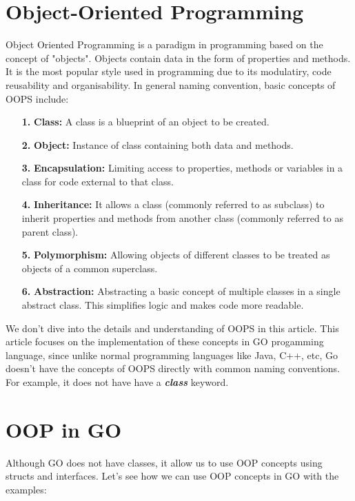 \documentclass[12pt,a4paper]{report}
\begin{document}
\section*{Object-Oriented Programming}
Object Oriented Programming is a paradigm in programming based on the concept of "objects". Objects contain data in the form of properties and methods.
It is the most popular style used in programming due to its modulatiry, code reusability and organisability.
In general naming convention, basic concepts of OOPS include:

\begin{enumerate}
    \item[\textbf{1.}]\textbf{Class:} A class is a blueprint of an object to be created.
    \item[\textbf{2.}]\textbf{Object:} Instance of class containing both data and methods.
    \item[\textbf{3.}]\textbf{Encapsulation:} Limiting access to properties, methods or variables in a class for code external to that class.
    \item[\textbf{4.}]\textbf{Inheritance:} It allows a class (commonly referred to as subclass) to inherit properties and methods from another class (commonly referred to as parent class).
    \item[\textbf{5.}]\textbf{Polymorphism:} Allowing objects of different classes to be treated as objects of a common superclass.
    \item[\textbf{6.}]\textbf{Abstraction:} Abstracting a basic concept of multiple classes in a single abstract class. This simplifies logic and makes code more readable.     
\end{enumerate}
We don't dive into the details and understanding of OOPS in this article. This article focuses on the implementation of these concepts in GO progamming language,
since unlike normal programming languages like Java, C++, etc, Go doesn't have the concepts of OOPS directly with common naming conventions.
For example, it does not have have a \textbf{\textit{class}} keyword.
\section*{OOP in GO}
Although GO does not have classes, it allow us to use OOP concepts using structs and interfaces. Let's see how we can use
OOP concepts in GO with the examples:
\end{document}
